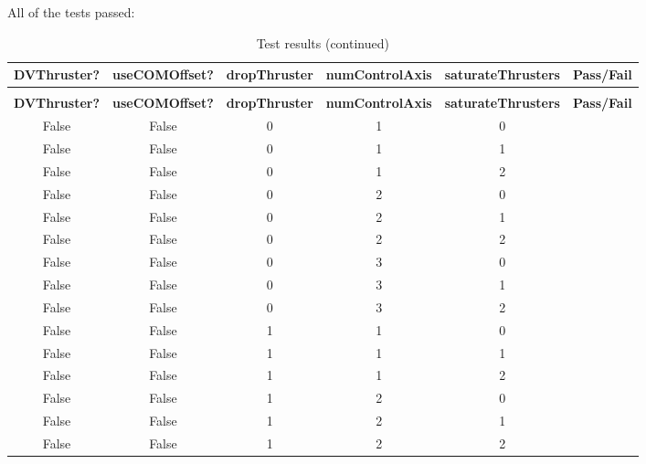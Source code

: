 All of the tests passed:
{\centering \fontsize{10}{12}\selectfont
\begin{longtable}{c | c | c | c | c | c}
	\caption{Test results}
	\label{tab:results} \\
	\hline\hline
	\textbf{DVThruster?} & \textbf{useCOMOffset?} & \textbf{dropThruster} & \textbf{numControlAxis} & \textbf{saturateThrusters} & \textbf{Pass/Fail} \\
	\hline
	\endfirsthead
	\caption[]{Test results (continued)} \\
	\hline\hline
	\textbf{DVThruster?} & \textbf{useCOMOffset?} & \textbf{dropThruster} & \textbf{numControlAxis} & \textbf{saturateThrusters} & \textbf{Pass/Fail} \\
	\hline
	\endhead
		False & False & 0 & 1 & 0 &  \\
		False & False & 0 & 1 & 1 &  \\
		False & False & 0 & 1 & 2 &  \\
		False & False & 0 & 2 & 0 &  \\
		False & False & 0 & 2 & 1 &  \\
		False & False & 0 & 2 & 2 &  \\
		False & False & 0 & 3 & 0 &  \\
		False & False & 0 & 3 & 1 &  \\
		False & False & 0 & 3 & 2 &  \\
		False & False & 1 & 1 & 0 &  \\
		False & False & 1 & 1 & 1 &  \\
		False & False & 1 & 1 & 2 &  \\
		False & False & 1 & 2 & 0 &  \\
		False & False & 1 & 2 & 1 &  \\
		False & False & 1 & 2 & 2 &  \\

\end{longtable}}
